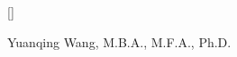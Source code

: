 



 
\usepackage[square, numbers]{natbib}
\usepackage{bibentry}
\titleformat{\section}{\Large\scshape\raggedright}{}{0em}{}[\titlerule]





\usepackage{longtable}



\pagestyle{empty} %


\par{\centering
		{ \huge  Yuanqing Wang, }
        { \small M.B.A., M.F.A., Ph.D.}
 \bigskip\par}

